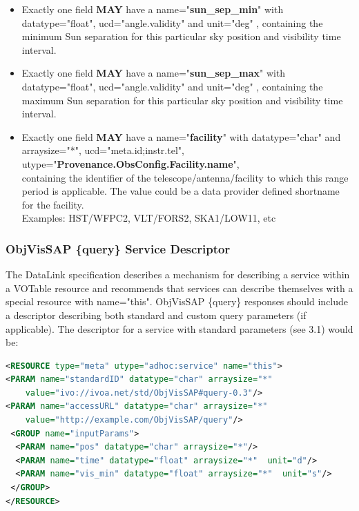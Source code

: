 \documentclass[11pt,a4paper]{ivoatex/ivoa}
\begin{document}
\begin{itemize}
\item {Exactly one field \textbf{MAY }have a name="\textbf{sun\_sep\_min}" with\\
datatype="float", ucd="angle.validity" and
unit="deg" , containing the minimum Sun separation for this particular
sky position and visibility time interval.}

\item {Exactly one field \textbf{MAY }have a name="\textbf{sun\_sep\_max}" with\\
datatype="float", ucd="angle.validity" and
unit="deg" , containing the maximum Sun separation for this particular
sky position and visibility time interval.}

\item {Exactly one field \textbf{MAY} have a name="\textbf{facility}" 
with datatype="char" and arraysize="*", ucd="meta.id;instr.tel",\\
utype="\textbf{Provenance.ObsConfig.Facility.name}",\\ 
containing the identifier of the telescope/antenna/facility to which
this range period is applicable. The value could be a data provider
defined shortname for the facility. \\
Examples: HST/WFPC2, VLT/FORS2, SKA1/LOW11, etc}
\end{itemize}

\subsubsection{ObjVisSAP \{query\} Service Descriptor}
The DataLink specification describes a mechanism for describing a
service within a VOTable resource and recommends that services can
describe themselves with a special resource with name="this". ObjVisSAP
\{query\} responses should include a descriptor describing both standard
and custom query parameters (if applicable). The descriptor for a
service with standard parameters (see 3.1) would be:\\

\begin{lstlisting}[language=XML]
<RESOURCE type="meta" utype="adhoc:service" name="this">
<PARAM name="standardID" datatype="char" arraysize="*"
    value="ivo://ivoa.net/std/ObjVisSAP#query-0.3"/>
<PARAM name="accessURL" datatype="char" arraysize="*"
    value="http://example.com/ObjVisSAP/query"/>
 <GROUP name="inputParams">
  <PARAM name="pos" datatype="char" arraysize="*"/>
  <PARAM name="time" datatype="float" arraysize="*"	 unit="d"/>
  <PARAM name="vis_min" datatype="float" arraysize="*"	unit="s"/>
 </GROUP>
</RESOURCE>
\end{lstlisting}
\end{document}
